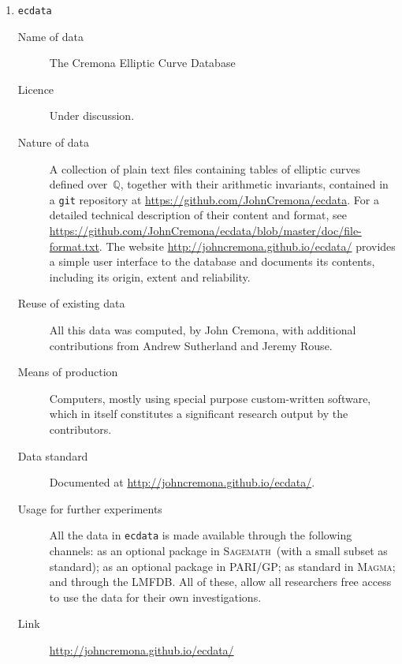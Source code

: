 \documentclass[12pt]{article}
\newcommand{\software}[1]{\textsc{#1}\xspace}
\newcommand{\Sage}{\software{Sagemath}}
\newcommand{\PARIGP}{\software{PARI/GP}}
\newcommand{\Magma}{\software{Magma}}
\newcommand{\Q}{\(\mathbb{Q}\)}
\begin{document}
\begin{enumerate}
\item{{\tt ecdata}}
\begin{description}
\item[Name of data] The Cremona Elliptic Curve Database
\item[Licence]  Under discussion.
\item[Nature of data] A collection of plain text files containing
  tables of elliptic curves defined over~\Q, together with their
  arithmetic invariants, contained in a {\tt git} repository at
  \url{https://github.com/JohnCremona/ecdata}.  For a detailed
  technical description of their content and format, see
  \url{https://github.com/JohnCremona/ecdata/blob/master/doc/file-format.txt}.
  The website \url{http://johncremona.github.io/ecdata/} provides a
  simple user interface to the database and documents its contents,
  including its origin, extent and reliability.
\item[Reuse of existing data] All this data was computed, by John
  Cremona, with additional contributions from Andrew Sutherland and
  Jeremy Rouse.
\item[Means of production] Computers, mostly using special purpose
  custom-written software, which in itself constitutes a significant
  research output by the contributors.
\item[Data standard] Documented at
\url{http://johncremona.github.io/ecdata/}.
\item [Usage for further experiments] All the data in {\tt ecdata} is
  made available through the following channels: as an optional package
  in \Sage\ (with a small subset as standard); as an optional package
  in \PARIGP; as standard in \Magma; and through the LMFDB.  All of
  these, allow all researchers free access to use the data for their
  own investigations.
\item [Link] \url{http://johncremona.github.io/ecdata/}
\end{description}


\end{enumerate}
\end{document}
